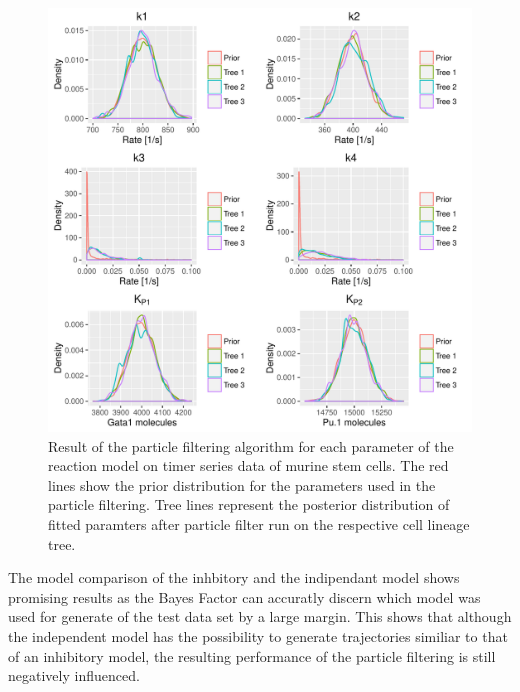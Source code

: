 \documentclass{bioinfo}
\begin{document}
\begin{figure}[h]
\includegraphics[width=\textwidth]{figures/real_data.pdf}
\caption{Result of the particle filtering algorithm for each parameter of the reaction model on timer series data of murine stem cells. The red lines show the prior distribution for the parameters used in the particle filtering. Tree lines represent the posterior distribution of fitted paramters after particle filter run  on the respective cell lineage tree.}  \label{fig:05}
\end{figure}

The model comparison of the inhbitory and the indipendant model shows promising results as the Bayes Factor can accuratly discern which model was used for generate of the test data set by a large margin. This shows that although the independent model has the possibility to generate trajectories similiar to that of an inhibitory model, the resulting performance of the particle filtering is still negatively influenced.
\end{document}
